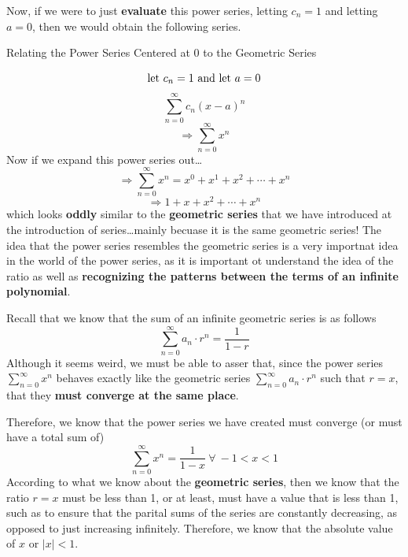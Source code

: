 \begin{center}
\end{center}
Now, if we were to just \textbf{evaluate} this
power series, letting $ c_{n} = 1 $ and letting
$ a = 0 $, then we would obtain the following series.
\begin{remark*}[]
  Relating the Power Series Centered at 0 to the
  Geometric Series
\end{remark*}

\[ \textrm{let $ c_{n} = 1 $ and let $ a = 0 $}\]
\[ \sum_{n=0}^{\infty} c_{n}(x-a)^{n}\]
\[ \Rightarrow  \sum_{n=0}^{\infty} x^{n}\]
Now if we expand this power series out\dots
\[ \Rightarrow \sum_{n=0}^{\infty} x^{n} = x^{0} + x^{1} +
  x^{2} + \cdots + x^{n} \]
\[ \Rightarrow 1 + x + x^{2} + \cdots + x^{n } \]
which looks \textbf{oddly} similar to the
\textbf{geometric series} that we have introduced
at the introduction of series\dots mainly becuase
it is the same geometric series! The idea that the
power series resembles the geometric series is a
very importnat idea in the world of the power series,
as it is important ot understand the idea of the ratio
as well as \textbf{recognizing the patterns between the
  terms of an infinite polynomial}.
\par Recall that we know that the sum of an infinite
geometric series is as follows
\[ \sum_{n=0}^{\infty} a_{n} \cdot r^{n} = \frac{1}{1-r} \]
Although it seems weird, we must be able
to asser that, since the power series
$ \sum_{n=0}^{\infty} x^{n}$ behaves exactly
like the geometric series $ \sum_{n=0}^{\infty} a_{n} \cdot r^{n}$
such that $ r = x $, that they \textbf{must converge
  at the same place}.
\par Therefore, we know that the power series we
have created must converge (or must have a total sum
of)
\[ \sum_{n=0}^{\infty} x^{n} = \frac{1}{1-x} ~ \forall ~
-1 < x < 1 \]
According to what we know about the \textbf{geometric
  series}, then we know that the ratio $ r = x $ must
be less than 1, or at least, must have a value that is less
than 1, such as to ensure that the parital sums
of the series are constantly decreasing, as opposed to just
increasing infinitely.
Therefore, we know that the absolute value of $ x $ or
$ |x| < 1 $.
